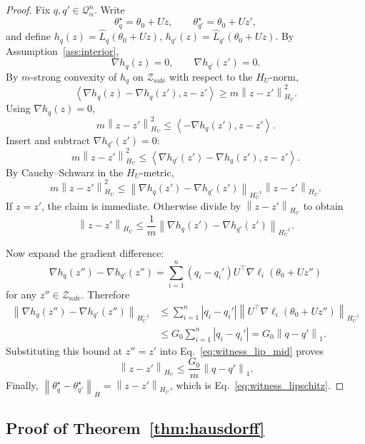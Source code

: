 \documentclass{article}
\newcommand{\cQ}{\mathcal{Q}}
\newcommand{\cZ}{\mathcal{Z}}
\newcommand{\loss}{\ell}
\newcommand{\norm}[1]{\left\lVert #1 \right\rVert}
\newcommand{\abs}[1]{\left\lvert #1 \right\rvert}
\newcommand{\inner}[2]{\left\langle #1, #2 \right\rangle}
\newcommand{\safe}{\mathrm{safe}}
\begin{document}
\begin{proof}
Fix \(q,q'\in\cQ_\alpha^n\). Write
\[
\theta_q^\star=\theta_0+Uz,
\qquad
\theta_{q'}^\star=\theta_0+Uz',
\]
and define \(h_q(z)=\widehat L_q(\theta_0+Uz)\), \(h_{q'}(z)=\widehat L_{q'}(\theta_0+Uz)\). By Assumption~\ref{ass:interior},
\[
\nabla h_q(z)=0,
\qquad
\nabla h_{q'}(z')=0.
\]
By \(m\)-strong convexity of \(h_q\) on \(\cZ_{\safe}\) with respect to the \(H_U\)-norm,
\[
\inner{\nabla h_q(z)-\nabla h_q(z')}{z-z'}
\ge
m \norm{z-z'}_{H_U}^2.
\]
Using \(\nabla h_q(z)=0\),
\[
m \norm{z-z'}_{H_U}^2
\le
\inner{-\nabla h_q(z')}{z-z'}.
\]
Insert and subtract \(\nabla h_{q'}(z')=0\):
\[
m \norm{z-z'}_{H_U}^2
\le
\inner{\nabla h_{q'}(z')-\nabla h_q(z')}{z-z'}.
\]
By Cauchy--Schwarz in the \(H_U\)-metric,
\[
m \norm{z-z'}_{H_U}^2
\le
\norm{\nabla h_q(z')-\nabla h_{q'}(z')}_{H_U^{-1}}
\norm{z-z'}_{H_U}.
\]
If \(z=z'\), the claim is immediate. Otherwise divide by \(\norm{z-z'}_{H_U}\) to obtain
\begin{equation}
\norm{z-z'}_{H_U}
\le
\frac{1}{m}
\norm{\nabla h_q(z')-\nabla h_{q'}(z')}_{H_U^{-1}}.
\label{eq:witness_lip_mid}
\end{equation}

Now expand the gradient difference:
\[
\nabla h_q(z'')-\nabla h_{q'}(z'')
=
\sum_{i=1}^{n}(q_i-q_i')U^\top \nabla \loss_i(\theta_0+Uz'')
\]
for any \(z''\in\cZ_{\safe}\). Therefore
\begin{align*}
\norm{\nabla h_q(z'')-\nabla h_{q'}(z'')}_{H_U^{-1}}
&\le
\sum_{i=1}^{n}
\abs{q_i-q_i'}
\norm{U^\top \nabla \loss_i(\theta_0+Uz'')}_{H_U^{-1}} \\
&\le
G_0 \sum_{i=1}^{n}\abs{q_i-q_i'}
=
G_0 \norm{q-q'}_1.
\end{align*}
Substituting this bound at \(z''=z'\) into Eq.~\eqref{eq:witness_lip_mid} proves
\[
\norm{z-z'}_{H_U}
\le
\frac{G_0}{m}\norm{q-q'}_1.
\]
Finally, \(\norm{\theta_q^\star-\theta_{q'}^\star}_H=\norm{z-z'}_{H_U}\), which is Eq.~\eqref{eq:witness_lipschitz}.
\end{proof}

\subsection{Proof of Theorem~\ref{thm:hausdorff}}
\end{document}
